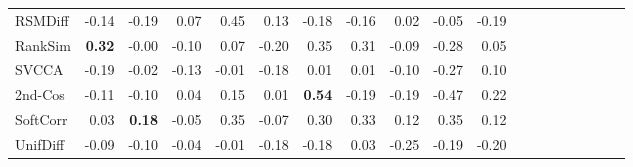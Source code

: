 \begin{tabular}{l||rrr|rrr|rrr||rrr|rrr|rrr}
RSMDiff & -0.14 & -0.19 & 0.07 & 0.45 & 0.13 & -0.18 & -0.16 & 0.02 & -0.05 & -0.19 \\
RankSim & \textbf{0.32} & -0.00 & -0.10 & 0.07 & -0.20 & 0.35 & 0.31 & -0.09 & -0.28 & 0.05 \\
SVCCA & -0.19 & -0.02 & -0.13 & -0.01 & -0.18 & 0.01 & 0.01 & -0.10 & -0.27 & 0.10 \\
2nd-Cos & -0.11 & -0.10 & 0.04 & 0.15 & 0.01 & \textbf{0.54} & -0.19 & -0.19 & -0.47 & 0.22 \\
SoftCorr & 0.03 & \textbf{0.18} & -0.05 & 0.35 & -0.07 & 0.30 & 0.33 & 0.12 & 0.35 & 0.12 \\
UnifDiff & -0.09 & -0.10 & -0.04 & -0.01 & -0.18 & -0.18 & 0.03 & -0.25 & -0.19 & -0.20 \\
\bottomrule
\end{tabular}
